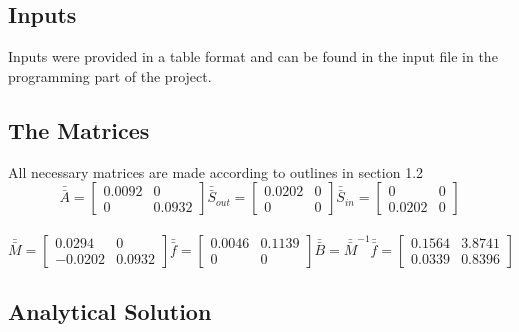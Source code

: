 \documentclass[11pt, oneside]{article}   	%
\begin{document}
\subsection{Inputs}
Inputs were provided in a table format and can be found in the input file in the programming part of the project.
\subsection{The Matrices}
All necessary matrices are made according to outlines in section 1.2
$$
\bar{\bar{A}} = \begin{bmatrix}
0.0092 &0 \\ 
0 & 0.0932
\end{bmatrix} \bar{\bar{S}}_{out} = \begin{bmatrix}
0.0202 &0 \\ 
0 & 0
\end{bmatrix} \bar{\bar{S}}_{in} = \begin{bmatrix}
0 &0 \\ 
0.0202 & 0
\end{bmatrix}$$
\\
$$ \bar{\bar{M}} = \begin{bmatrix}
0.0294 &0 \\ 
-0.0202 & 0.0932
\end{bmatrix}\bar{\bar{f}} = \begin{bmatrix}
0.0046 &0.1139 \\ 
0 & 0
\end{bmatrix}\bar{\bar{B}} = \bar{\bar{M}}^{-1}\bar{\bar{f}} = \begin{bmatrix}
0.1564&3.8741 \\ 
0.0339 & 0.8396
\end{bmatrix}$$

\subsection{Analytical Solution}
\end{document}
